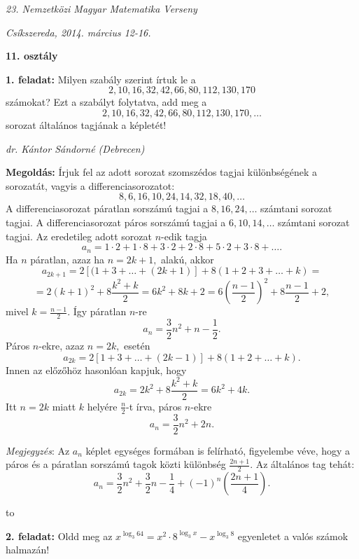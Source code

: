 \documentclass[a4paper,10pt]{article}
\newcommand{\ki}[2]{\hfill {\it #1 (#2)}\medskip}
\newcommand{\vonal}{\hbox to \hsize{\hskip2truecm\hrulefill\hskip2truecm}}
\begin{document}
\begin{center} \Large {\em 23. Nemzetközi Magyar Matematika Verseny} \end{center}
\begin{center} \large{\em Csíkszereda, 2014. március 12-16.} \end{center}
\smallskip
\begin{center} \large{\bf 11. osztály} \end{center}
\bigskip


{\bf 1. feladat: } Milyen szabály szerint írtuk le a $$2, 10, 16, 32, 42, 66, 80,
112, 130, 170$$ számokat? Ezt a szabályt folytatva, add meg a
    \[
        2, 10, 16, 32, 42, 66, 80, 112, 130, 170, \ldots
    \]
    sorozat általános tagjának a képletét!


\ki{dr. Kántor Sándorné}{Debrecen}\medskip



{\bf Megoldás: }  Írjuk fel az adott sorozat szomszédos tagjai különbségének a sorozatát,
 vagyis a differenciasorozatot: $$8, 6, 16, 10, 24, 14, 32, 18, 40,
 \ldots$$
 A differenciasorozat  páratlan sorszámú tagjai a  $8, 16, 24,
 \ldots$ számtani sorozat tagjai. A differenciasorozat  páros sorszámú tagjai
a $6, 10, 14, \ldots$ számtani sorozat tagjai. Az eredetileg adott
sorozat $n$-edik tagja $$a_n = 1\cdot 2 + 1\cdot8 + 3 \cdot2 +2
\cdot 8+ 5\cdot 2+ 3\cdot 8+ \ldots .$$ Ha $n$ páratlan, azaz  ha $n
= 2k + 1,$ alakú, akkor $$a_{2 k + 1} = 2 [( 1+ 3 + \ldots + (2 k
+1) ] + 8 ( 1 + 2 + 3 + \ldots + k)=$$
$$=2(k + 1)^2 + 8\frac{k^2+k}{2}=6k^2+8k+2=6\left(
\frac{n-1}{2}\right)^2+8\frac{n-1}{2}+2,$$ mivel $k=\frac{n-1}{2}.$
Így páratlan $n$-re \[{a_n} = \frac{3}{2}{n^2} + n -
\frac{1}{2}.\] Páros $n$-ekre, azaz $n = 2 k,$ esetén $$a_{2 k} =
2[1 + 3 +\ldots + (2 k-1)]+ 8 (1+ 2+\ldots + k).$$ Innen az 
előzőhöz hasonlóan kapjuk, hogy $$a_{2 k} = 2{k^2} + 8\frac{{{k^2}
+ k}}{2} = 6{k^2} + 4k.$$ Itt $n = 2 k$ miatt $k$ helyére $\frac
n2$-t írva, páros $n$-ekre $$a_n= \frac 32 n^2+2n.$$

\medskip

\textit{Megjegyzés}: Az $a_n$ képlet egységes formában is felírható,
figyelembe véve, hogy a páros és a páratlan sorszámú tagok közti
különbség $\frac{2n+1}{2}.$ Az általános tag tehát:
\[{a_n} = \frac{3}{2}{n^2} + \frac{3}{2}n - \frac{1}{4} + {\left( { - 1} \right)^n}\left( {\frac{{2n + 1}}{4}} \right).\]

\medskip

\vonal

{\bf 2. feladat: } Oldd meg az $\displaystyle x^{\log_3 64} = x^2\cdot8^{\log_3 x} -
x^{\log_3 8}$ egyenletet a valós számok halmazán!
\end{document}
